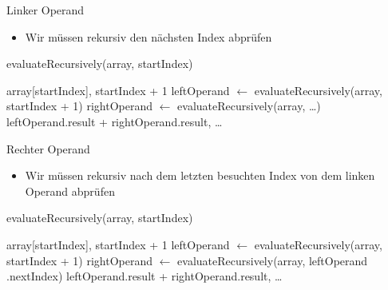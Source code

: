 \documentclass{../tuda-beamer}
\begin{document}
    \begin{frame}{Linker Operand}
        \begin{itemize}
            \item Wir müssen rekursiv den nächsten Index abprüfen
        \end{itemize}

        \begin{algorithm}[H]
            \caption{evaluateRecursively(array, startIndex)}
            \begin{algorithmic}[1]
                    \State \Return array[startIndex], startIndex + 1
                \Else
                    \State leftOperand \(\leftarrow\) evaluateRecursively(array, startIndex + 1)
                    \State rightOperand \(\leftarrow\) evaluateRecursively(array, \dots)
                    \State \Return leftOperand.result + rightOperand.result, \dots
                \EndIf
            \end{algorithmic}
        \end{algorithm}
    \end{frame}

    \begin{frame}{Rechter Operand}
        \begin{itemize}
            \item Wir müssen rekursiv nach dem letzten besuchten Index von dem linken Operand
            abprüfen
        \end{itemize}

        \begin{algorithm}[H]
            \caption{evaluateRecursively(array, startIndex)}
            \begin{algorithmic}[1]
                    \State \Return array[startIndex], startIndex + 1
                \Else
                    \State leftOperand \(\leftarrow\) evaluateRecursively(array, startIndex + 1)
                    \State rightOperand \(\leftarrow\) evaluateRecursively(array, leftOperand
                    .nextIndex)
                    \State \Return leftOperand.result + rightOperand.result, \dots
                \EndIf
            \end{algorithmic}
        \end{algorithm}
    \end{frame}
\end{document}
